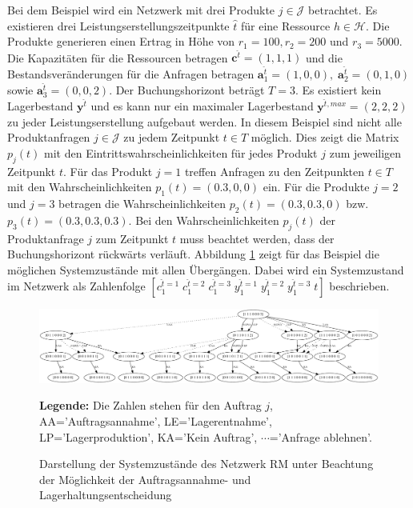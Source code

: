 Bei dem Beispiel wird ein Netzwerk mit drei Produkte $j\in\mathcal{J}$ betrachtet. Es existieren drei Leistungserstellungszeitpunkte $\hat t$ für eine Ressource $h\in\mathcal{H}$. Die Produkte generieren einen Ertrag in Höhe von $r_1=100, r_2=200$ und $r_3=5000$. Die Kapazitäten für die Ressourcen betragen $\textbf{c}^{\hat t}=(1,1,1)$ und die Bestandsveränderungen für die Anfragen betragen $\textbf{a}^{\hat t}_1=(1,0,0),\; \textbf{a}^{\hat t}_2=(0,1,0)$ sowie $\textbf{a}^{\hat t}_3=(0,0,2)$. Der Buchungshorizont beträgt $T=3$. Es existiert kein Lagerbestand $\textbf{y}^{\hat t}$ und es kann nur ein maximaler Lagerbestand $\textbf{y}^{\hat t, max}=(2, 2, 2)$ zu jeder Leistungserstellung aufgebaut werden. In diesem Beispiel sind nicht alle Produktanfragen $j\in\mathcal{J}$ zu jedem Zeitpunkt $t\in T$ möglich. Dies zeigt die Matrix $p_{j}(t)$ mit den Eintrittswahrscheinlichkeiten für jedes Produkt $j$ zum jeweiligen Zeitpunkt $t$. Für das Produkt $j=1$ treffen Anfragen zu den Zeitpunkten $t\in T$ mit den Wahrscheinlichkeiten $p_{1}(t)=(0.3, 0, 0)$ ein. Für die Produkte $j=2$ und $j=3$ betragen die Wahrscheinlichkeiten $p_{2}(t)=(0.3, 0.3, 0)$ bzw. $p_{3}(t)=(0.3, 0.3, 0.3)$. Bei den Wahrscheinlichkeiten $p_j(t)$ der Produktanfrage $j$ zum Zeitpunkt $t$ muss beachtet werden, dass der Buchungshorizont rückwärts verläuft. Abbildung \ref{B9} zeigt für das Beispiel die möglichen Systemzustände mit allen Übergängen. Dabei wird ein Systemzustand im Netzwerk als Zahlenfolge $[c^{\hat t=1}_1\;c^{\hat t=2}_1\;c_1^{\hat t=3}\;y_1^{\hat t=1}\;y_1^{\hat t=2}\;y_1^{\hat t=3}\;t]$ beschrieben.

\begin{figure}[h!]
  \begin{center}
    \includegraphics[width=200mm, angle=90]{Bilder/Beispiel9.pdf}
    \caption{Darstellung der Systemzustände des Netzwerk RM unter Beachtung der Möglichkeit der Auftragsannahme- und Lagerhaltungsentscheidung}  \label{B9}
    {\footnotesize \textbf{Legende:} Die Zahlen stehen für den Auftrag $j$, AA='Auftragsannahme', LE='Lagerentnahme', LP='Lagerproduktion', KA='Kein Auftrag', $\cdots$='Anfrage ablehnen'.} 
  \end{center}
\end{figure}

